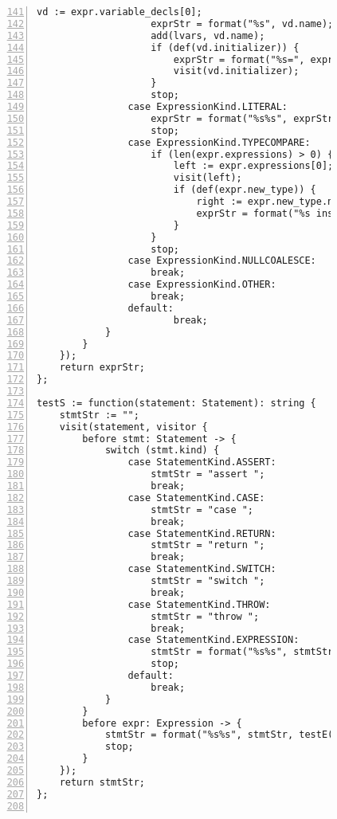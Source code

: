\begin{figure}[ht!]
\begin{lstlisting}[numbers=left, tabsize=4, escapechar=@, caption={API Usage Mining Analysis},label={lst:aun-code},  firstline = 141, firstnumber = 141, lastline = 201]
                    vd := expr.variable_decls[0];
                    exprStr = format("%s", vd.name);
                    add(lvars, vd.name);
                    if (def(vd.initializer)) {
                        exprStr = format("%s=", exprStr);
                        visit(vd.initializer);
                    }
                    stop;
                case ExpressionKind.LITERAL:
                    exprStr = format("%s%s", exprStr, expr.literal);
                    stop;
                case ExpressionKind.TYPECOMPARE:
                    if (len(expr.expressions) > 0) {
                        left := expr.expressions[0];
                        visit(left);
                        if (def(expr.new_type)) {
                            right := expr.new_type.name;
                            exprStr = format("%s instanceof %s", exprStr, right);
                        }
                    }
                    stop;
                case ExpressionKind.NULLCOALESCE:
                    break;
                case ExpressionKind.OTHER:
                    break;
                default:    
                        break;
            }
        }
    });
    return exprStr;
};

testS := function(statement: Statement): string {
    stmtStr := "";
    visit(statement, visitor {
        before stmt: Statement -> {
            switch (stmt.kind) {
                case StatementKind.ASSERT:
                    stmtStr = "assert ";
                    break;
                case StatementKind.CASE:
                    stmtStr = "case ";
                    break;
                case StatementKind.RETURN:
                    stmtStr = "return ";
                    break;
                case StatementKind.SWITCH:
                    stmtStr = "switch ";
                    break;
                case StatementKind.THROW:
                    stmtStr = "throw ";
                    break;
                case StatementKind.EXPRESSION:
                    stmtStr = format("%s%s", stmtStr, testE(stmt.expression));
                    stop;
                default:    
                    break;
            }
        }
        before expr: Expression -> {
            stmtStr = format("%s%s", stmtStr, testE(expr));    
            stop;
        }
    });
    return stmtStr;
};


\end{lstlisting}
\end{figure}
